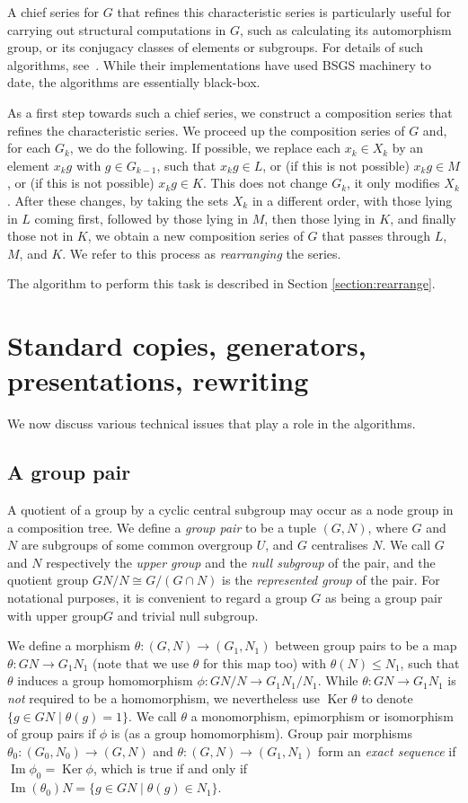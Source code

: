 \documentclass[12pt,twoside,reqno,psamsfonts]{amsproc}
\newcommand{\repgp}{{represented group}\xspace}
\newcommand{\uppergp}{{upper group}\xspace}
\newcommand{\nullsubgp}{{null subgroup}\xspace}
\numberwithin{equation}{section}
\numberwithin{figure}{section}
\newcounter{algorithm}
\theoremstyle{plain}
\theoremstyle{definition}
\theoremstyle{remark}
\DeclareMathOperator{\Ker}{Ker}
\DeclareMathOperator{\Imm}{Im}
\begin{document}
A chief series for $G$ that refines this characteristic series is particularly
useful for carrying out structural computations in $G$, such as
calculating its automorphism group, or its conjugacy classes of elements or
subgroups. For details of such algorithms, see~\cite[Chapter 10]{hcgt}. 
While their implementations have used BSGS machinery to date, 
the algorithms are essentially black-box. 

As a first step towards such a chief series, we construct
a composition series that refines the characteristic series.
We proceed up the composition series of $G$ and, for each $G_k$, we do the
following.
If possible, we replace each $x_k \in X_k$ by an element
$x_kg$ with $g \in G_{k-1}$, such that $x_kg \in L$, or (if this is not
possible) $x_kg \in M$, or (if this is not possible) $x_kg \in K$.
This does not change $G_k$, it only modifies $X_k$.
After these changes, by taking the sets $X_k$
in a different order, with those lying in $L$ coming first, followed by
those lying in $M$, then those lying in $K$, and finally those not in $K$, we
obtain a new composition series of $G$ that passes through $L$, $M$, and $K$.
We refer to this process as {\it rearranging} the series.

The algorithm to perform this task is described in Section
\ref{section:rearrange}.

\section{Standard copies, generators, presentations, rewriting}
We now discuss various technical issues that
play a role in the algorithms.

\subsection{A group pair}
A quotient of a group by a cyclic central
subgroup may occur as a node group in a composition tree. We define a
{\em group pair} to be a tuple $(G,N)$, where $G$ and $N$ are
subgroups of some common overgroup $U$, and $G$ centralises $N$. 
We call $G$ and
$N$ respectively the {\em \uppergp} and the {\em \nullsubgp} of the pair,
and the quotient group $GN/N \cong G/(G \cap N)$ is the {\em \repgp} of the
pair. For notational purposes, it is convenient to regard a group $G$ as being
a group pair with \uppergp $G$ and trivial \nullsubgp.

We define a morphism $\theta:(G,N) \rightarrow (G_1,N_1)$ between
group pairs to be a map $\theta :GN \rightarrow G_1N_1$ (note that we
use $\theta$ for this map too) with
$\theta(N) \leqslant N_1$,
such that $\theta$ induces a group homomorphism
$\phi:GN/N \rightarrow G_1N_1/N_1$.
While $\theta:GN \to G_1N_1$ is {\it not} required to be a homomorphism,
we nevertheless use $\Ker \theta$ to denote
$\{ g \in GN \mid \theta(g) = 1 \}$.
We call $\theta$ a monomorphism, epimorphism or isomorphism of group
pairs if $\phi$ is (as a group homomorphism).
Group pair morphisms $\theta_0:(G_0,N_0) \rightarrow (G,N)$ and
$\theta:(G,N) \rightarrow (G_1,N_1)$ form an {\em exact sequence}
if $\Imm\phi_0 = \Ker \phi $, which is true if and only
if $\Imm(\theta_0) N = \{g \in GN \mid \theta(g) \in N_1 \}$.
\end{document}
